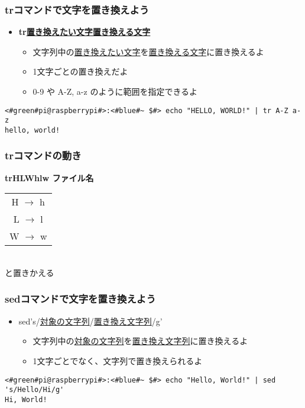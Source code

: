 \begin{frame}[fragile]
    \frametitle{trコマンドで文字を置き換えよう}
    \begin{itemize}
        \item {\bf tr\textvisiblespace\underline{置き換えたい文字}\textvisiblespace\underline{置き換える文字}}
        \begin{itemize}
            \small
            \item 文字列中の\underline{置き換えたい文字}を\underline{置き換える文字}に置き換えるよ
            \item 1文字ごとの置き換えだよ
            \item 0-9 や A-Z, a-z のように範囲を指定できるよ
        \end{itemize}
    \end{itemize}
    \begin{lstlisting}[title=範囲指定を使った置き換え, label=tr_range]
<#green#pi@raspberrypi#>:<#blue#~ $#> echo "HELLO, WORLD!" | tr A-Z a-z
hello, world!
    \end{lstlisting}
\end{frame}

\begin{frame}
    \frametitle{trコマンドの動き}
    \begin{center}
        {\bf tr\textvisiblespace HLW\textvisiblespace hlw ファイル名}\\
        \vspace{\zh}
        \begin{tabular}{c}
        H $\rightarrow$ h \\
        L $\rightarrow$ l \\
        W $\rightarrow$ w \\ 
        \end{tabular}\\
        と置きかえる
    \end{center}
\end{frame}

\begin{frame}[fragile]
    \frametitle{sedコマンドで文字を置き換えよう}
    \begin{itemize}
        \item sed\textvisiblespace 's/\underline{対象の文字列}/\underline{置き換え文字列}/g'
        \begin{itemize}
            \small
            \item 文字列中の\underline{対象の文字列}を\underline{置き換え文字列}に置き換えるよ
            \item 1文字ごとでなく、文字列で置き換えられるよ
        \end{itemize}
    \end{itemize}
    \begin{lstlisting}[title=sedでの文字の置き換え, label=sed_app]
<#green#pi@raspberrypi#>:<#blue#~ $#> echo "Hello, World!" | sed 's/Hello/Hi/g'
Hi, World!
    \end{lstlisting}
\end{frame}

